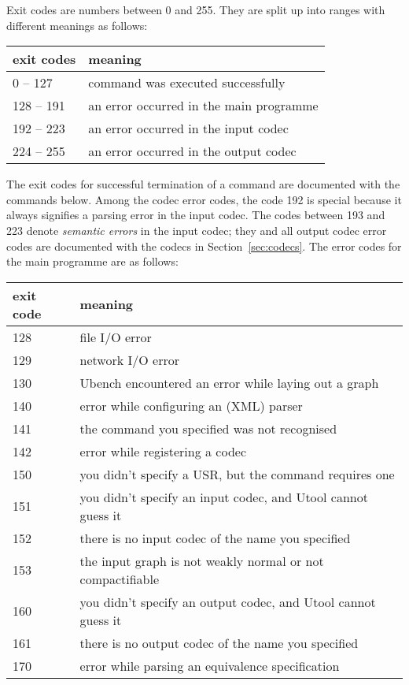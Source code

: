 Exit codes are numbers between 0 and 255. They are split up into
ranges with different meanings as follows:

\begin{tabular}{l|l}
exit codes & meaning \\\hline
0 -- 127 & command was executed successfully \\
128 -- 191 & an error occurred in the main programme \\
192 -- 223 & an error occurred in the input codec \\
224 -- 255 & an error occurred in the output codec
\end{tabular}

The exit codes for successful termination of a command are documented
with the commands below. Among the codec error codes, the code 192 is
special because it always signifies a parsing error in the input
codec. The codes between 193 and 223 denote \emph{semantic errors} in
the input codec; they and all output codec error codes are documented
with the codecs in Section~\ref{sec:codecs}. The error codes for the
main programme are as follows:

\begin{tabular}{l|l}
exit code & meaning \\\hline
128 & file I/O error \\
129 & network I/O error \\
130 & Ubench encountered an error while laying out a graph \\

140 & error while configuring an (XML) parser \\
141 & the command you specified was not recognised \\
142 & error while registering a codec \\

150 & you didn't specify a USR, but the command requires one \\
151 & you didn't specify an input codec, and Utool cannot guess it \\
152 & there is no input codec of the name you specified \\
153 & the input graph is not weakly normal or not compactifiable \\

160 & you didn't specify an output codec, and Utool cannot guess it \\
161 & there is no output codec of the name you specified \\

170 & error while parsing an equivalence specification
\end{tabular}




